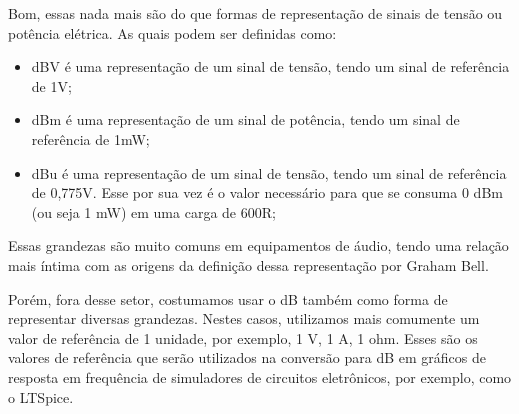  Bom, essas nada mais são do que formas de representação de sinais de tensão ou potência elétrica. As quais podem ser definidas como:
 \begin{itemize}
     \item dBV é uma representação de um sinal de tensão, tendo um sinal de referência de 1V;
     \item dBm é uma representação de um sinal de potência, tendo um sinal de referência de 1mW;
     \item dBu é uma representação de um sinal de tensão, tendo um sinal de referência de 0,775V. Esse por sua vez é o valor necessário para que se consuma 0 dBm (ou seja 1 mW) em uma carga de 600R;
 \end{itemize}
 
 Essas grandezas são muito comuns em equipamentos de áudio, tendo uma relação mais íntima com as origens da definição dessa representação por Graham Bell. 

 Porém, fora desse setor, costumamos usar o dB também como forma de representar diversas grandezas. Nestes casos, utilizamos mais comumente um valor de referência de 1 unidade, por exemplo, 1 V, 1 A, 1 ohm. Esses são os valores de referência que serão utilizados na conversão para dB em gráficos de resposta em frequência de simuladores de circuitos eletrônicos, por exemplo, como o LTSpice.
 
 